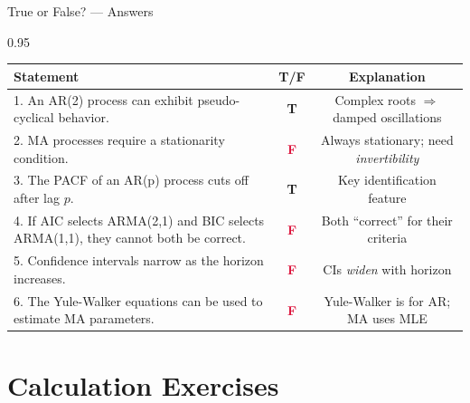 \documentclass[9pt, aspectratio=169, t]{beamer}
\begin{document}
\begin{frame}{True or False? --- Answers}
    \begin{cminipage}{0.95\textwidth}
    \scriptsize
    \begin{center}
    \begin{tabular}{p{7.5cm}cc}
        \toprule
        \textbf{Statement} & \textbf{T/F} & \textbf{Explanation} \\
        \midrule
        1. An AR(2) process can exhibit pseudo-cyclical behavior. & \textcolor{Forest}{\textbf{T}} & {\tiny Complex roots $\Rightarrow$ damped oscillations} \\[0.08cm]
        2. MA processes require a stationarity condition. & \textcolor{Crimson}{\textbf{F}} & {\tiny Always stationary; need \textit{invertibility}} \\[0.08cm]
        3. The PACF of an AR(p) process cuts off after lag $p$. & \textcolor{Forest}{\textbf{T}} & {\tiny Key identification feature} \\[0.08cm]
        4. If AIC selects ARMA(2,1) and BIC selects ARMA(1,1), they cannot both be correct. & \textcolor{Crimson}{\textbf{F}} & {\tiny Both ``correct'' for their criteria} \\[0.08cm]
        5. Confidence intervals narrow as the horizon increases. & \textcolor{Crimson}{\textbf{F}} & {\tiny CIs \textit{widen} with horizon} \\[0.08cm]
        6. The Yule-Walker equations can be used to estimate MA parameters. & \textcolor{Crimson}{\textbf{F}} & {\tiny Yule-Walker is for AR; MA uses MLE} \\
        \bottomrule
    \end{tabular}
    \end{center}
    \end{cminipage}
\end{frame}

\section{Calculation Exercises}
\end{document}
